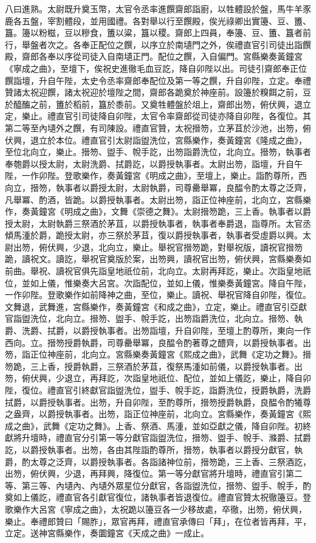 \begin{pinyinscope}
 八曰進熟。太尉既升奠玉幣，太官令丞率進饌齋郎詣廚，以牲體設於盤，馬牛羊豕鹿各五盤，宰割體段，並用國禮。各對舉以行至饌殿，俟光祿卿出實籩、豆、簠、簋。籩以粉糍，豆以糝食，簠以粱，簋以稷。齋郎上四員，奉籩、豆、簠、簋者前行，舉盤者次之。各奉正配位之饌，以序立於南壝門之外，俟禮直官引司徒出詣饌殿，齋郎各奉以序從司徒入自南壝正門。配位之饌，入自偏門。宮縣樂奏黃鐘宮《寧成之曲》，至壇下，俟祝史進徹毛血豆訖，降自卯陛以出。司徒引齋郎奉正位饌詣壇，升自午陛，太史令丞率齋郎奉配位及第一等之饌，升自卯陛，立定。奉禮贊諸太祝迎饌，諸太祝迎於壇陛之間，齋郎各跪奠於神座前。設籩於糗餌之前，豆於醯醢之前，簠於稻前，簋於黍前。又奠牲體盤於俎上，齋郎出笏，俯伏興，退立定，樂止。禮直官引司徒降自卯陛，太官令率齋郎從司徒亦降自卯陛，各復位。其第二等至內壝外之饌，有司陳設。禮直官贊，太祝搢笏，立茅苴於沙池，出笏，俯伏興，退立於本位。禮直官引太尉詣盥洗位，宮縣樂作，奏黃鐘宮《隆成之曲》，至位北向立，樂止。搢笏、盥手、帨手訖，出笏詣爵洗位，北向立。搢笏，執事者奉匏爵以授太尉，太尉洗爵、拭爵訖，以爵授執事者。太尉出笏，詣壇，升自午陛，一作卯陛。登歌樂作，奏黃鐘宮《明成之曲》，至壇上，樂止。詣酌尊所，西向立，搢笏，執事者以爵授太尉，太尉執爵，司尊罍舉冪，良醖令酌太尊之泛齊，凡舉冪、酌酒，皆跪。以爵授執事者。太尉出笏，詣正位神座前，北向立，宮縣樂作，奏黃鐘宮《明成之曲》，文舞《崇德之舞》。太尉搢笏跪，三上香。執事者以爵授太尉，太尉執爵三祭酒於茅苴，以爵授執事者，執事者奉爵退，詣尊所。太官丞傾馬湩於爵，跪授太尉，亦三祭於茅苴，復以爵授執事者，執事者受虛爵以興。太尉出笏，俯伏興，少退，北向立，樂止。舉祝官搢笏跪，對舉祝版，讀祝官搢笏跪，讀祝文。讀訖，舉祝官奠版於案，出笏興，讀祝官出笏，俯伏興，宮縣樂奏如前曲。舉祝、讀祝官俱先詣皇地祇位前，北向立。太尉再拜訖，樂止。次詣皇地祇位，並如上儀，惟樂奏大呂宮。次詣配位，並如上儀，惟樂奏黃鐘宮。降自午陛，一作卯陛。登歌樂作如前降神之曲，至位，樂止。讀祝、舉祝官降自卯陛，復位。文舞退，武舞進，宮縣樂作，奏黃鐘宮《和成之曲》，立定，樂止。禮直官引亞獻官詣盥洗位，北向立。搢笏、盥手、帨手訖，出笏詣爵洗位，北向立。搢笏、執爵、洗爵、拭爵，以爵授執事者。出笏詣壇，升自卯陛，至壇上酌尊所，東向一作西向。立。搢笏授爵執爵，司尊罍舉冪，良醖令酌著尊之醴齊，以爵授執事者。出笏，詣正位神座前，北向立。宮縣樂奏黃鐘宮《熙成之曲》，武舞《定功之舞》。搢笏跪，三上香，授爵執爵，三祭酒於茅苴，復祭馬湩如前儀，以爵授執事者。出笏，俯伏興，少退立，再拜訖，次詣皇地祇位、配位，並如上儀訖，樂止，降自卯陛，復位。禮直官引終獻官詣盥洗位，盥手、帨手訖，詣爵洗位，授爵執爵，洗爵拭爵，以爵授執事者。出笏，升自卯陛，至酌尊所，搢笏授爵執爵，良醖令酌犧尊之盎齊，以爵授執事者。出笏，詣正位神座前，北向立。宮縣樂作，奏黃鐘宮《熙成之曲》，武舞《定功之舞》。上香、祭酒、馬湩，並如亞獻之儀，降自卯陛。初終獻將升壇時，禮直官分引第一等分獻官詣盥洗位，搢笏、盥手、帨手、滌爵、拭爵訖，以爵授執事者。出笏，各由其陛詣酌尊所，搢笏，執事者以爵授分獻官，執爵，酌太尊之泛齊，以爵授執事者。各詣諸神位前，搢笏跪，三上香、三祭酒訖，出笏，俯伏興，少退，再拜興，降復位。第一等分獻官將升壇時，禮直官引第二等、第三等、內壝內、內壝外眾星位分獻官，各詣盥洗位，搢笏、盥手、帨手，酌奠如上儀訖，禮直官各引獻官復位，諸執事者皆退復位。禮直官贊太祝徹籩豆。登歌樂作大呂宮《寧成之曲》，太祝跪以籩豆各一少移故處，卒徹，出笏，俯伏興，樂止。奉禮郎贊曰「賜胙」，眾官再拜，禮直官承傳曰「拜」，在位者皆再拜，平，立定。送神宮縣樂作，奏圜鐘宮《天成之曲》一成止。




\end{pinyinscope}
